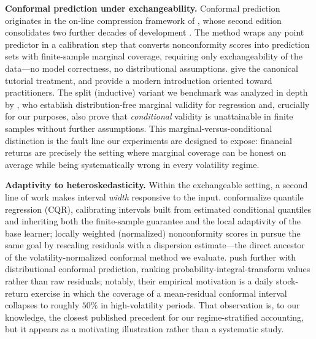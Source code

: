 \documentclass[11pt]{article}
\begin{document}
\textbf{Conformal prediction under exchangeability.} Conformal prediction
originates in the on-line compression framework of \citet{vovk2005algorithmic},
whose second edition consolidates two further decades of development
\citep{vovk2022algorithmic}. The method wraps any point predictor in a
calibration step that converts nonconformity scores into prediction sets with
finite-sample marginal coverage, requiring only exchangeability of the
data---no model correctness, no distributional assumptions.
\citet{shafer2008tutorial} give the canonical tutorial treatment, and
\citet{angelopoulos2023conformal} provide a modern introduction oriented toward
practitioners. The split (inductive) variant we benchmark was analyzed in
depth by \citet{lei2018distribution}, who establish distribution-free marginal
validity for regression and, crucially for our purposes, also prove that
\emph{conditional} validity is unattainable in finite samples without further
assumptions. This marginal-versus-conditional distinction is the fault line
our experiments are designed to expose: financial returns are precisely the
setting where marginal coverage can be honest on average while being
systematically wrong in every volatility regime.

\textbf{Adaptivity to heteroskedasticity.} Within the exchangeable setting, a
second line of work makes interval \emph{width} responsive to the input.
\citet{romano2019conformalized} conformalize quantile regression (CQR),
calibrating intervals built from estimated conditional quantiles and
inheriting both the finite-sample guarantee and the local adaptivity of the
base learner; locally weighted (normalized) nonconformity scores in
\citet{lei2018distribution} pursue the same goal by rescaling residuals with a
dispersion estimate---the direct ancestor of the volatility-normalized
conformal method we evaluate. \citet{chernozhukov2021distributional} push
further with distributional conformal prediction, ranking
probability-integral-transform values rather than raw residuals; notably,
their empirical motivation is a daily stock-return exercise in which the
coverage of a mean-residual conformal interval collapses to roughly $50\%$ in
high-volatility periods. That observation is, to our knowledge, the closest
published precedent for our regime-stratified accounting, but it appears as a
motivating illustration rather than a systematic study.
\end{document}

